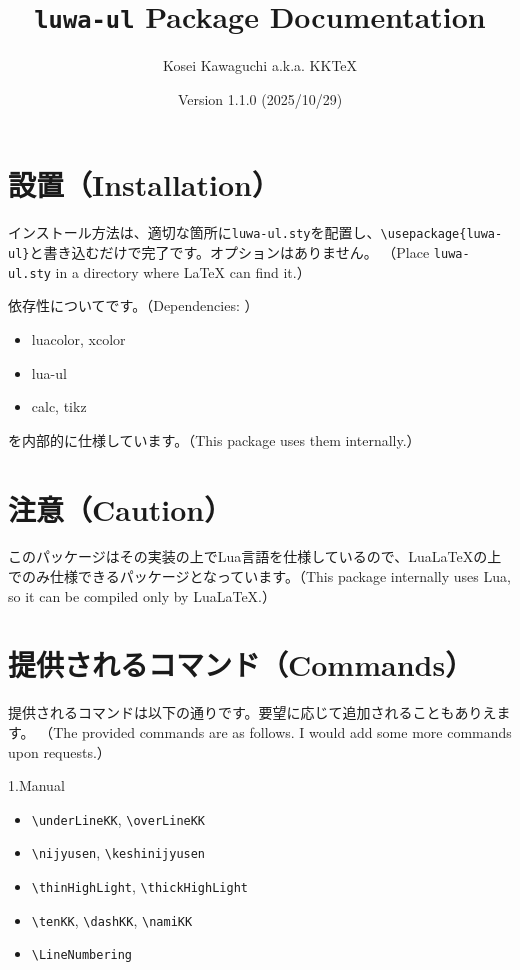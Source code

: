\documentclass[luatex,fontsize=8pt,paper=b5,twoside]{jlreq}%
\title{\texttt{luwa-ul} Package Documentation}
\author{Kosei Kawaguchi a.k.a. KKTeX}
\date{Version 1.1.0 (2025/10/29)}
\begin{document}
\begin{titlepage}
  \maketitle
\end{titlepage}
\newpage
\tableofcontents
\newpage

\section{設置（Installation）}
インストール方法は、適切な箇所に\texttt{luwa-ul.sty}を配置し、\verb|\usepackage{luwa-ul}|と書き込むだけで完了です。オプションはありません。
（Place \texttt{luwa-ul.sty} in a directory where LaTeX can find it.）

依存性についてです。（Dependencies: ）

\begin{itemize}
  \item luacolor, xcolor
  \item lua-ul
  \item calc, tikz
\end{itemize}

\noindent を内部的に仕様しています。（This package uses them internally.）

\section{注意（Caution）}
このパッケージはその実装の上でLua言語を仕様しているので、LuaLaTeXの上でのみ仕様できるパッケージとなっています。（This package internally uses Lua, so it can be compiled only by LuaLaTeX.）

\section{提供されるコマンド（Commands）}
提供されるコマンドは以下の通りです。要望に応じて追加されることもありえます。
（The provided commands are as follows. I would add some more commands upon requests.）

\noindent 1.Manual
\begin{itemize}
  \item \verb|\underLineKK|, \verb|\overLineKK|
  \item \verb|\nijyusen|, \verb|\keshinijyusen|
  \item \verb|\thinHighLight|, \verb|\thickHighLight|
  \item \verb|\tenKK|, \verb|\dashKK|, \verb|\namiKK|
  \item \verb|\LineNumbering|
\end{itemize}
\end{document}
